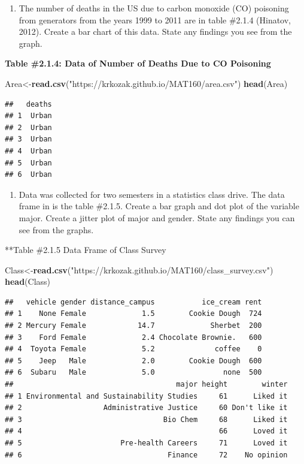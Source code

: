 \documentclass[
]{book}
\newenvironment{Shaded}{\begin{snugshade}}{\end{snugshade}}
\newcommand{\KeywordTok}[1]{\textcolor[rgb]{0.13,0.29,0.53}{\textbf{#1}}}
\newcommand{\NormalTok}[1]{#1}
\newcommand{\StringTok}[1]{\textcolor[rgb]{0.31,0.60,0.02}{#1}}
\providecommand{\tightlist}{%
  \setlength{\itemsep}{0pt}\setlength{\parskip}{0pt}}
\begin{document}
\begin{enumerate}
\def\labelenumi{\arabic{enumi}.}
\setcounter{enumi}{2}
\tightlist
\item
  The number of deaths in the US due to carbon monoxide (CO) poisoning from generators from the years 1999 to 2011 are in table \#2.1.4 (Hinatov, 2012). Create a bar chart of this data. State any findings you see from the graph.
\end{enumerate}

\textbf{Table \#2.1.4: Data of Number of Deaths Due to CO Poisoning}

\begin{Shaded}
\begin{Highlighting}[]
\NormalTok{Area<-}\KeywordTok{read.csv}\NormalTok{(}\StringTok{"https://krkozak.github.io/MAT160/area.csv"}\NormalTok{)}
\KeywordTok{head}\NormalTok{(Area)}
\end{Highlighting}
\end{Shaded}

\begin{verbatim}
##   deaths
## 1  Urban
## 2  Urban
## 3  Urban
## 4  Urban
## 5  Urban
## 6  Urban
\end{verbatim}

\begin{enumerate}
\def\labelenumi{\arabic{enumi}.}
\setcounter{enumi}{3}
\tightlist
\item
  Data was collected for two semesters in a statistics class drive. The data frame in is the table \#2.1.5. Create a bar graph and dot plot of the variable major. Create a jitter plot of major and gender. State any findings you can see from the graphs.
\end{enumerate}

**Table \#2.1.5 Data Frame of Class Survey

\begin{Shaded}
\begin{Highlighting}[]
\NormalTok{Class<-}\KeywordTok{read.csv}\NormalTok{(}\StringTok{"https://krkozak.github.io/MAT160/class_survey.csv"}\NormalTok{)}
\KeywordTok{head}\NormalTok{(Class)}
\end{Highlighting}
\end{Shaded}

\begin{verbatim}
##   vehicle gender distance_campus           ice_cream rent
## 1    None Female             1.5        Cookie Dough  724
## 2 Mercury Female            14.7             Sherbet  200
## 3    Ford Female             2.4 Chocolate Brownie.   600
## 4  Toyota Female             5.2              coffee    0
## 5    Jeep   Male             2.0        Cookie Dough  600
## 6  Subaru   Male             5.0                none  500
##                                      major height        winter
## 1 Environmental and Sustainability Studies     61      Liked it
## 2                   Administrative Justice     60 Don't like it
## 3                                 Bio Chem     68      Liked it
## 4                                              66      Loved it
## 5                       Pre-health Careers     71      Loved it
## 6                                  Finance     72    No opinion
\end{verbatim}
\end{document}
